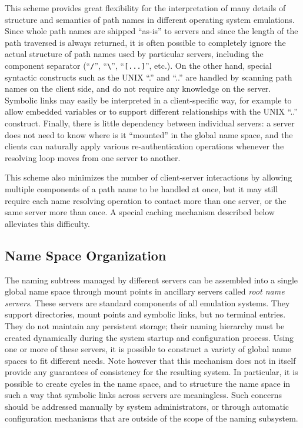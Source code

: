 This scheme provides great flexibility for the interpretation of many
details of structure and semantics of path names in different
operating system emulations. Since whole path names are shipped
``as-is'' to servers and since the length of the path traversed is
always returned, it is often possible to completely ignore the actual
structure of path names used by particular servers, including the
component separator (``\verb+/+'', ``\verb+\+'', ``\verb+[...]+'',
etc.). On the other hand, special syntactic constructs such as the
UNIX ``.'' and ``..'' are handled by scanning path names on the client
side, and do not require any knowledge on the server. Symbolic links
may easily be interpreted in a client-specific way, for example to
allow embedded variables or to support different relationships with
the UNIX ``..'' construct. Finally, there is little dependency between
individual servers: a server does not need to know where is it
``mounted'' in the global name space, and the clients can naturally
apply various re-authentication operations whenever the resolving loop
moves from one server to another.

This scheme also minimizes the number of client-server interactions by
allowing multiple components of a path name to be handled at once, but
it may still require each name resolving operation to contact more
than one server, or the same server more than once. A special caching
mechanism described below alleviates this difficulty.

\subsection{Name Space Organization}

The naming subtrees managed by different servers can be assembled into
a single global name space through mount points in ancillary servers
called {\em root name servers}.  These servers are standard components
of all emulation systems. They support directories, mount points and
symbolic links, but no terminal entries.  They do not maintain any
persistent storage; their naming hierarchy must be created dynamically
during the system startup and configuration process. Using one or more
of these servers, it is possible to construct a variety of global name
spaces to fit different needs. Note however that this mechanism does
not in itself provide any guarantees of consistency for the resulting
system. In particular, it is possible to create cycles in the name
space, and to structure the name space in such a way that symbolic
links across servers are meaningless. Such concerns should be
addressed manually by system administrators, or through automatic
configuration mechanisms that are outside of the scope of the naming
subsystem.

